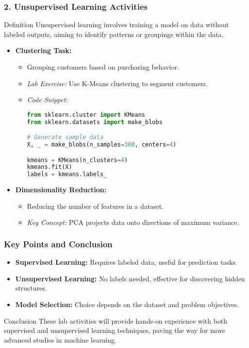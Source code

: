 \documentclass[aspectratio=169]{beamer}
\begin{document}
\begin{frame}[fragile]
    \frametitle{2. Unsupervised Learning Activities}
    \begin{block}{Definition}
        Unsupervised learning involves training a model on data without labeled outputs, aiming to identify patterns or groupings within the data.
    \end{block}
    \begin{itemize}
        \item \textbf{Clustering Task:}
            \begin{itemize}
                \item Grouping customers based on purchasing behavior.
                \item \textit{Lab Exercise:} Use K-Means clustering to segment customers.
                \item \textit{Code Snippet:}
                \begin{lstlisting}[language=Python]
from sklearn.cluster import KMeans
from sklearn.datasets import make_blobs

# Generate sample data
X, _ = make_blobs(n_samples=300, centers=4)

kmeans = KMeans(n_clusters=4)
kmeans.fit(X)
labels = kmeans.labels_
                \end{lstlisting}
            \end{itemize}
        \item \textbf{Dimensionality Reduction:}
            \begin{itemize}
                \item Reducing the number of features in a dataset.
                \item \textit{Key Concept:} PCA projects data onto directions of maximum variance.
            \end{itemize}
    \end{itemize}
\end{frame}

\begin{frame}
    \frametitle{Key Points and Conclusion}
    \begin{itemize}
        \item \textbf{Supervised Learning:} Requires labeled data, useful for prediction tasks.
        \item \textbf{Unsupervised Learning:} No labels needed, effective for discovering hidden structures.
        \item \textbf{Model Selection:} Choice depends on the dataset and problem objectives.
    \end{itemize}
    \begin{block}{Conclusion}
        These lab activities will provide hands-on experience with both supervised and unsupervised learning techniques, paving the way for more advanced studies in machine learning.
    \end{block}
\end{frame}
\end{document}
